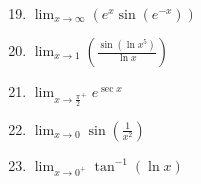\documentclass[12pt]{article}
\newif\ifans
\begin{document}
\begin{enumerate}
\setcounter{enumi}{18}

\item $\displaystyle \lim_{x\rightarrow \infty}{\left(e^x \sin {(e^{-x})}\right)}$\\

\ifans{\fbox{1}} \fi

\item $\displaystyle \lim_{x\rightarrow 1}{\left(\frac{\sin{(\ln x^5)}}{\ln x}\right)}$ 

\ifans{\fbox{5}} \fi

\item $\displaystyle \lim_{x \rightarrow \frac{\pi}{2}^+}{e^{\sec{x}}}$

\ifans{\fbox{0}} \fi

\item $\displaystyle \lim_{x \rightarrow 0}{\sin{\left(\frac{1}{x^2}\right)}}$

\ifans{\fbox{DNE}} \fi

\item $\displaystyle \lim_{x \rightarrow 0^+}{\tan^{-1}{(\ln{x})}}$

\ifans{\fbox{$\displaystyle -\frac{\pi}{2}$}} \fi

\end{enumerate}

\end{document}
